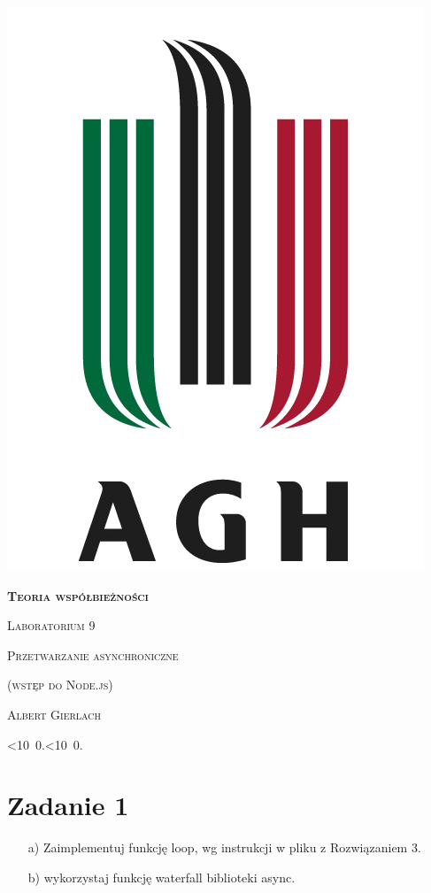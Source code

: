 \documentclass[12pt]{article}
\def\mydate{\leavevmode\hbox{\twodigits\day.\twodigits\month.\the\year}}
\def\twodigits#1{\ifnum#1<10 0\fi\the#1}
\begin{document}
\thispagestyle{empty}
\begin{center}
\begin{minipage}{0.75\linewidth}
    \centering
    \includegraphics[width=0.45\linewidth]{agh_logo2.png}
    \par
    \vspace{2cm}
    {\bfseries{\scshape{\Huge  Teoria współbieżności}}}
    \par
    \vspace{1.7cm}
    {\scshape{\Large Laboratorium 9}}
    \par
    \vspace{0.8cm}
    {\scshape{\Large Przetwarzanie asynchroniczne}}
    \par
    \vspace{0.5cm}
    {\scshape{\Large(wstęp do Node.js)}}
    \par
    \vspace{3cm}

    {\scshape{\Large Albert Gierlach}}\par
    \vspace{1cm}

    {\Large \mydate}
\end{minipage}
\end{center}
\clearpage



\section{Zadanie 1}
\begin{enumerate}
    \item [a)] Zaimplementuj funkcję loop, wg instrukcji w pliku z Rozwiązaniem 3.
    \item [b)] wykorzystaj funkcję waterfall biblioteki async.
\end{enumerate}
\end{document}
